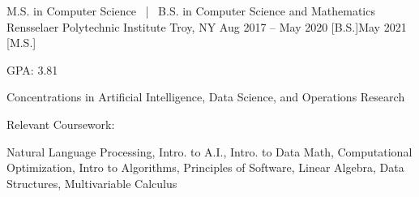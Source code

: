 


\begin{cventries}

  \cventry
  {M.S. in Computer Science \, | \, B.S. in Computer Science and Mathematics}
  {Rensselaer Polytechnic Institute}
  {Troy, NY}
  {Aug 2017 – May 2020 [B.S.]\newline May 2021 [M.S.]}
  {
    \begin{cvitems}
      \item GPA: 3.81
      \item Concentrations in Artificial Intelligence, Data Science, and Operations Research
      \item Relevant Coursework:
      \vspace*{1.15\abovedisplayskip}
      \begin{cvitems}
        \item Natural Language Processing, Intro. to A.I., Intro. to Data Math, Computational Optimization,  Intro to Algorithms, Principles of Software, Linear Algebra, Data Structures, Multivariable Calculus
      \end{cvitems}
    \end{cvitems}
  }


\end{cventries}